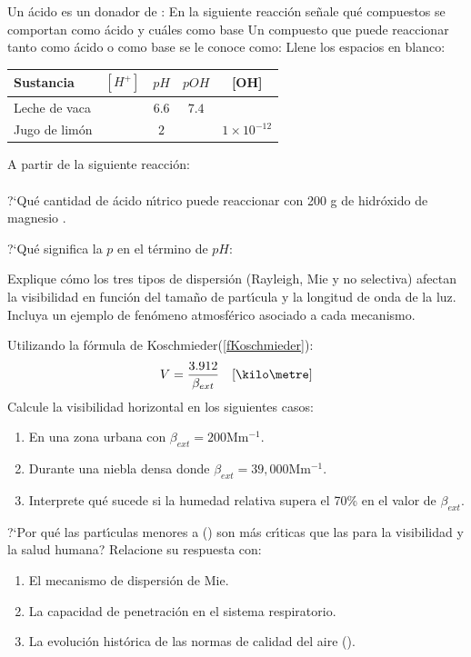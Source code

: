 \begin{exercises}
\exer Un \'acido es un donador de :\hrulefill
\exer En la siguiente reacci\'on se\~nale qu\'e compuestos se comportan como \'acido y cu\'ales como base 
\exer Un compuesto que puede reaccionar tanto como \'acido o como base se le conoce como:\hrulefill
\exer Llene los espacios en blanco:\\
\begin{tabular}{l|c|c|c|c}
Sustancia & $[H^+]$ & $pH$ & $pOH$ & [OH]\\ \hline
Leche de vaca &    & $6.6$ &$7.4$ &  \\
\hline Jugo de lim\'on & &$2$ & &$1\times10^{-12}$ \\
\hline 
\end{tabular}
\exer A partir de la siguiente reacci\'on:\\\vskip 3pt \\ \vskip 3pt ?`Qu\'e cantidad de \'acido n\'{\i}trico  puede reaccionar con 200 g de hidr\'oxido de magnesio . 

\exer ?`Qu\'e significa la $p$ en el t\'ermino de $pH$:
\hrulefill

\exer Explique c\'omo los tres tipos de dispersi\'on (Rayleigh, Mie y no selectiva) afectan la visibilidad en funci\'on del tama\~no de part\'{\i}cula y la longitud de onda de la luz. Incluya un ejemplo de fen\'omeno atmosf\'erico asociado a cada mecanismo.

\exer Utilizando la f\'ormula de Koschmieder(\ref{fKoschmieder}): 
\begin{equation*}
V=\frac{3.912}{\beta_{ext}}  \quad [\kilo\metre]
\end{equation*}
Calcule la visibilidad horizontal en los siguientes casos:
\begin{enumerate}
\item En una zona urbana con $\beta_{ext}=200 $Mm$^{-1}$.
\item Durante una niebla densa donde $\beta_{ext}=39,000 $Mm$^{-1}$.
\item Interprete qu\'e sucede si la humedad relativa supera el 70\% en el valor de $\beta_{ext}$.
\end{enumerate}

\exer ?`Por qu\'e las part\'{\i}culas menores a () son m\'as cr\'{\i}ticas que las  para la visibilidad y la salud humana? Relacione su respuesta con:
\begin{enumerate}
\item El mecanismo de dispersi\'on de Mie.
\item La capacidad de penetraci\'on en el sistema respiratorio.
\item La evoluci\'on hist\'orica de las normas de calidad del aire (). 
\end{enumerate}

\end{exercises}


